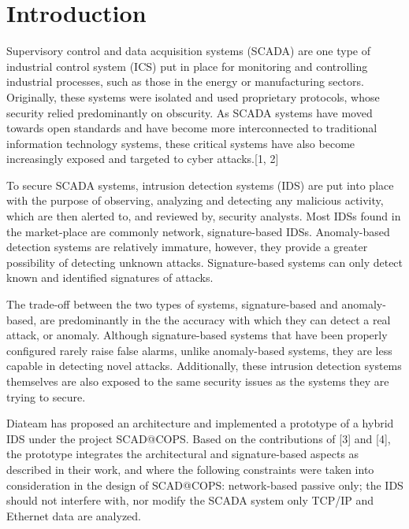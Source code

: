 \documentclass[12pt,]{article}
\begin{document}
\newpage
\mbox{} \thispagestyle{empty}

\clearpage
{}

\setcounter{page}{17}

\section{Introduction}\label{introduction}

Supervisory control and data acquisition systems (SCADA) are one type of
industrial control system (ICS) put in place for monitoring and
controlling industrial processes, such as those in the energy or
manufacturing sectors. Originally, these systems were isolated and used
proprietary protocols, whose security relied predominantly on obscurity.
As SCADA systems have moved towards open standards and have become more
interconnected to traditional information technology systems, these
critical systems have also become increasingly exposed and targeted to
cyber attacks.{[}1, 2{]}

To secure SCADA systems, intrusion detection systems (IDS) are put into
place with the purpose of observing, analyzing and detecting any
malicious activity, which are then alerted to, and reviewed by, security
analysts. Most IDSs found in the market-place are commonly network,
signature-based IDSs. Anomaly-based detection systems are relatively
immature, however, they provide a greater possibility of detecting
unknown attacks. Signature-based systems can only detect known and
identified signatures of attacks.

The trade-off between the two types of systems, signature-based and
anomaly-based, are predominantly in the the accuracy with which they can
detect a real attack, or anomaly. Although signature-based systems that
have been properly configured rarely raise false alarms, unlike
anomaly-based systems, they are less capable in detecting novel attacks.
Additionally, these intrusion detection systems themselves are also
exposed to the same security issues as the systems they are trying to
secure.

Diateam has proposed an architecture and implemented a prototype of a
hybrid IDS under the project SCAD@COPS. Based on the contributions of
{[}3{]} and {[}4{]}, the prototype integrates the architectural and
signature-based aspects as described in their work, and where the
following constraints were taken into consideration in the design of
SCAD@COPS: network-based passive only; the IDS should not interfere
with, nor modify the SCADA system only TCP/IP and Ethernet data are
analyzed.
\end{document}
